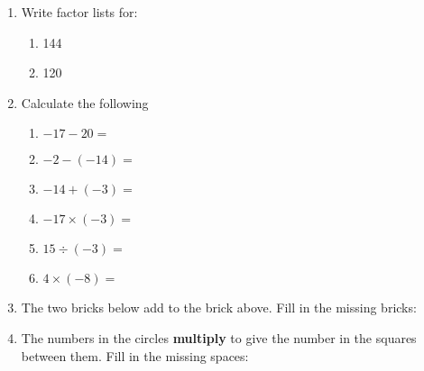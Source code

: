 \documentclass[a4paper,12pt]{article}
\begin{document}
\begin{enumerate}
\begin{multicols}{5}
\begin{enumerate}
			\item 18, 33
		\end{enumerate}
	\end{multicols}
	\item Write factor lists for:
	\begin{multicols}{4}
		\begin{enumerate}
			\item 144
			\item 120
		\end{enumerate} 
	\end{multicols}
	\item Calculate the following
	\begin{multicols}{3}
		\begin{enumerate}
			\item $\displaystyle -17-20= $
			\item $\displaystyle -2-(-14)= $
			\item $\displaystyle -14+(-3)=$
			\item $\displaystyle -17\times (-3)=$
			\item $\displaystyle 15\div (-3)=$
			\item $\displaystyle 4\times (-8)=$
		\end{enumerate}
	\end{multicols}
	\item The two bricks below add to the brick above. Fill in the missing bricks:\\
	\begin{center}
	\end{center}
	\newpage
	\item The numbers in the circles \textbf{multiply} to give the number in the squares between them. Fill in the missing spaces:\\
	\begin{center}
\end{center}
\end{enumerate}
\end{document}
